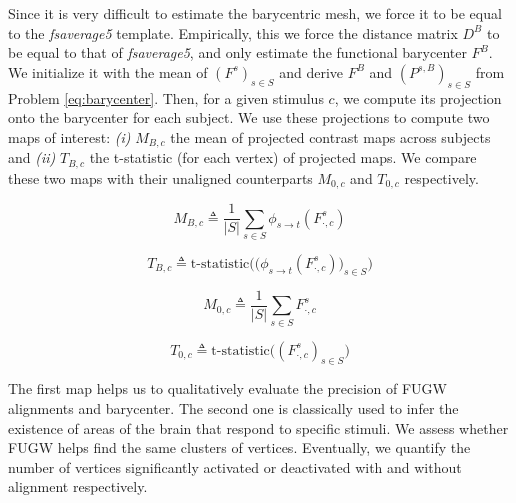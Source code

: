 Since it is very difficult to estimate the barycentric mesh, we force it to be equal to
the \emph{fsaverage5} template. Empirically, this we force the distance matrix $D^B$
to be equal to that of \emph{fsaverage5}, and only estimate the functional barycenter $F^B$.
We initialize it with the mean of $(F^s)_{s \in S}$
and derive $F^B$ and $(P^{s,B})_{s \in S}$ from Problem \eqref{eq:barycenter}.
Then, for a given stimulus $c$, we compute its projection onto the barycenter for each subject.
We use these projections to compute two maps of interest:
\textit{(i)} $M_{B,c}$ the mean of projected contrast maps across subjects
and \textit{(ii)} $T_{B,c}$ the t-statistic (for each vertex) of projected maps.
We compare these two maps with their unaligned counterparts $M_{0,c}$ and $T_{0,c}$ respectively.
\begin{figure}[ht]
    \begin{minipage}{.4\linewidth}
        \begin{equation*}
            M_{B,c} \triangleq \frac{1}{|S|} \sum_{s \in S} \phi_{s \rightarrow t}(F^s_{\cdot, c})
        \end{equation*}
    \end{minipage}
    \hfil
    \begin{minipage}{.5\linewidth}
        \begin{equation*}
            T_{B,c} \triangleq \text{t-statistic} \Big( \big(
                \phi_{s \rightarrow t}(F^s_{\cdot, c}) \big)_{s \in S} \Big)
        \end{equation*}
    \end{minipage}
\end{figure}
\begin{figure}[ht]
    \begin{minipage}{.4\linewidth}
        \begin{equation*}
            M_{0,c} \triangleq \frac{1}{|S|} \sum_{s \in S} F^s_{\cdot, c}
        \end{equation*}
    \end{minipage}
    \hfil
    \begin{minipage}{.5\linewidth}
        \begin{equation*}
            T_{0,c} \triangleq \text{t-statistic} \Big( (F^s_{\cdot, c})_{s \in S} \Big)
        \end{equation*}
    \end{minipage}
\end{figure}
The first map helps us to qualitatively evaluate the precision of FUGW alignments and barycenter.
The second one is classically used to infer the existence of areas of the brain that
respond to specific stimuli. We assess whether FUGW helps find the same clusters of vertices.
Eventually, we quantify the number of vertices significantly activated or deactivated
with and without alignment respectively.

